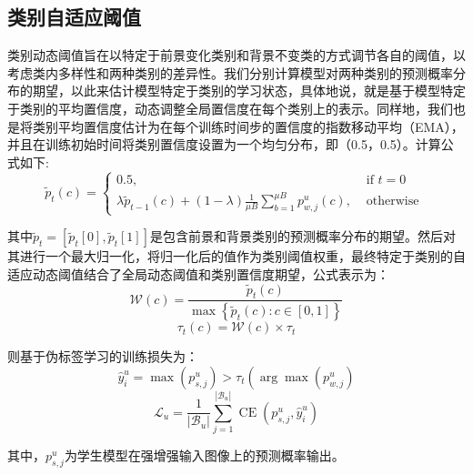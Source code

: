 \documentclass[lang=chs, degree=master, blindreview=false, adobe=false]{yanputhesis}
\begin{document}
\subsection{类别自适应阈值}
类别动态阈值旨在以特定于前景变化类别和背景不变类的方式调节各自的阈值，以考虑类内多样性和两种类别的差异性。我们分别计算模型对两种类别的预测概率分布的期望，以此来估计模型特定于类别的学习状态，具体地说，就是基于模型特定于类别的平均置信度，动态调整全局置信度在每个类别上的表示。同样地，我们也是将类别平均置信度估计为在每个训练时间步的置信度的指数移动平均（EMA），并且在训练初始时间将类别置信度设置为一个均匀分布，即（0.5，0.5）。计算公式如下:
\begin{equation}
    \label{eq:Adath_pmodel}
    \tilde{p}_{t}(c)=\left\{\begin{array}{ll}
      0.5, & \text { if } t=0 \\
      \lambda \tilde{p}_{t-1}(c)+(1-\lambda) \frac{1}{\mu B} \sum_{b=1}^{\mu B} p_{w, j}^{u}(c), & \text { otherwise }
      \end{array}\right.
\end{equation}

其中$\tilde{p}_{t} = [\tilde{p}_{t}[0], \tilde{p}_{t}[1]]$是包含前景和背景类别的预测概率分布的期望。然后对其进行一个最大归一化，将归一化后的值作为类别阈值权重，最终特定于类别的自适应动态阈值结合了全局动态阈值和类别置信度期望，公式表示为：
\begin{equation}
  \label{eq:Adath_weight}
  \mathcal{W}(c)=\frac{\tilde{p}_{t}(c)}{\max \left\{\tilde{p}_{t}(c): c \in[0, 1]\right\}}
\end{equation}
\begin{equation}
  \label{eq:Adath_localTh}
  \tau_{t}(c)=\mathcal{W}(c) \times \tau_{t}
\end{equation}

则基于伪标签学习的训练损失为：
\begin{equation}
  \label{eq:Adath_argmax}
  \hat{y}_{i}^{u}=\max \left(p_{s, j}^{u}\right)>\tau_{t}\left(\arg \max \left(p_{w, j}^{u}\right)\right.
\end{equation}
\begin{equation}
  \label{eq:Adath_lossU}
  \mathcal{L}_{u}=\frac{1}{\left|\mathcal{B}_{u}\right|} \sum_{j=1}^{\left|\mathcal{B}_{u}\right|} \operatorname{CE}\left(p_{s, j}^{u}, \hat{y}_{i}^{u}\right)
\end{equation}

其中，$p_{s, j}^{u}$为学生模型在强增强输入图像上的预测概率输出。
\end{document}
